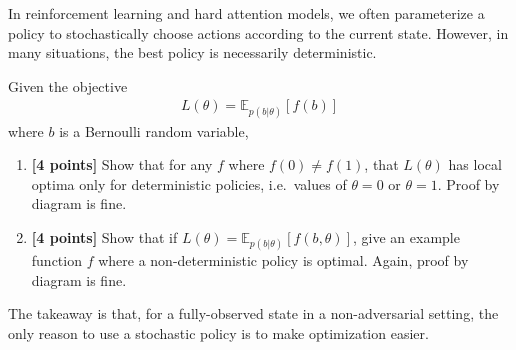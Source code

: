\documentclass{harvardml}
\newcommand{\E}{\mathbb{E}}
\theoremstyle{plain}
\begin{document}







\begin{problem}

In reinforcement learning and hard attention models, we often parameterize a policy to stochastically choose actions according to the current state.
However, in many situations, the best policy is necessarily deterministic.

Given the objective
%
\begin{align}
L(\theta) = \E_{p(b|\theta)} \left[ f(b) \right]
\end{align}
%
where $b$ is a Bernoulli random variable,

\begin{enumerate}[label=(\alph*)]
\item {\bf [4 points]} Show that for any $f$ where $f(0) \neq f(1)$, that $L(\theta)$ has local optima only for deterministic policies, i.e.\ values of $\theta = 0$ or $\theta = 1$.  Proof by diagram is fine.

\item {\bf [4 points]} Show that if $L(\theta) = \E_{p(b|\theta)} \left[ f(b, \theta) \right]$, give an example function $f$ where a non-deterministic policy is optimal.
Again, proof by diagram is fine.
\end{enumerate}

The takeaway is that, for a fully-observed state in a non-adversarial setting, the only reason to use a stochastic policy is to make optimization easier.
\end{problem}




\end{document}
